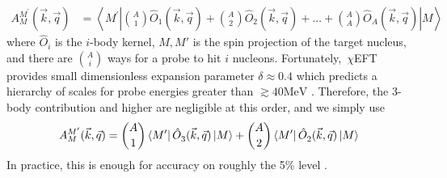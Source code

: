 \documentclass[a4paper,11pt]{article}
\newcommand\bv[1]{\vec{#1}}
\newcommand{\MeV}{\mathrm{MeV}}
\newcommand{\ChiEFT}{\,$\chi$EFT\,\,}
\begin{document}
\begin{align}
  A_{M}^{M^{\prime} }(\bv{k}, \bv{q})&=
 \left\langle M^{\prime}\left|
  \binom{A}{1} \hat{O}_{1}(\bv{k}, \bv{q}) +
  \binom{A}{2} \hat{O}_{2}(\bv{k}, \bv{q}) +... + 
  \binom{A}{A} \hat{O}_{A}(\bv{k}, \bv{q})
  \right|M
  \right\rangle
\end{align}
where $\hat{O}_i$ is the $i$-body kernel, $M,M'$ is the spin projection of the
target nucleus, and there are
$\binom{A}{i}$ ways for a probe to hit $i$ nucleons. 
Fortunately, \ChiEFT provides small dimensionless expansion parameter $\delta\approx 0.4$ \cite{hammer4He} which predicts a
hierarchy of scales for probe energies greater than
$\gtrsim 40 \MeV$ \cite{Griesshammer2012, Hildebrandt2005,Hildebrandt2010}.
Therefore, the 3-body contribution and higher are negligible at this
order, and we simply use
\begin{equation}
  A_{M}^{M^{\prime} }(\bv{k}, \bv{q})=\binom{A}{1}\left\langle
  M^{\prime}\right|\hat{O}_{3}^{}(\bv{k}, \bv{q})\left|M\right
  \rangle + \binom{A}{2} \left\langle
  M^{\prime}\right|\hat{O}_{2}^{}(\bv{k}, \bv{q}) \left|
  M\right\rangle\nonumber\\
\end{equation}
In practice, this is enough for accuracy on roughly the 5\% level \cite{hammer2020}. 
\end{document}
